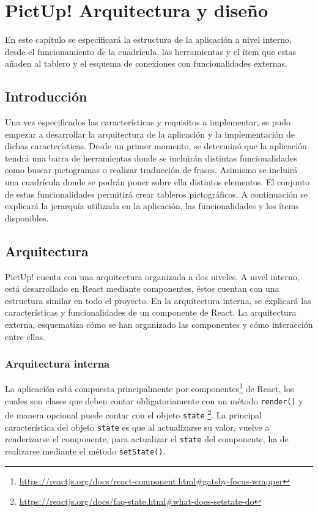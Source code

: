 \chapter{PictUp! Arquitectura y diseño}
\label{cap:arquitectura}



\begin{resumen} 
 En este capítulo se especificará la estructura de la aplicación a nivel interno, desde el funcionamiento de la cuadrícula, las herramientas y el ítem que estas añaden al tablero y el esquema de conexiones con funcionalidades externas. 
\end{resumen}

\section{Introducción}

Una vez especificados las características y requisitos a implementar, se pudo empezar a desarrollar la arquitectura de la aplicación y la implementación de dichas características. Desde un primer momento, se determinó que la aplicación tendrá una barra de herramientas donde se incluirán distintas funcionalidades como buscar pictogramas o realizar traducción de frases. Asimismo se incluirá una cuadrícula donde se podrán poner sobre ella distintos elementos. El conjunto de estas funcionalidades permitirá crear tableros pictográficos. A continuación se explicará la jerarquía utilizada en la aplicación, las funcionalidades y los ítems disponibles. 

\section{Arquitectura}

PictUp! cuenta con una arquitectura organizada a dos niveles. A nivel interno, está desarrollado en React mediante componentes, éstos cuentan con una estructura similar en todo el proyecto. En la arquitectura interna, se explicará las características y funcionalidades de un componente de React. La arquitectura externa, esquematiza cómo se han organizado las componentes y cómo interacción entre ellas. 



\subsection{Arquitectura interna}
La aplicación está compuesta principalmente por componentes\footnote{\url{https://reactjs.org/docs/react-component.html\#gatsby-focus-wrapper}} de React, los cuales son clases que deben contar obligatoriamente con un método \texttt{render()} y de manera opcional puede contar con el objeto \texttt{state} \footnote{\url{https://reactjs.org/docs/faq-state.html\#what-does-setstate-do}}. La principal característica del objeto \texttt{state} es que al actualizarse su valor, vuelve a renderizarse el componente, para actualizar el \texttt{state} del componente, ha de realizarse mediante el método \texttt{setState()}. 


